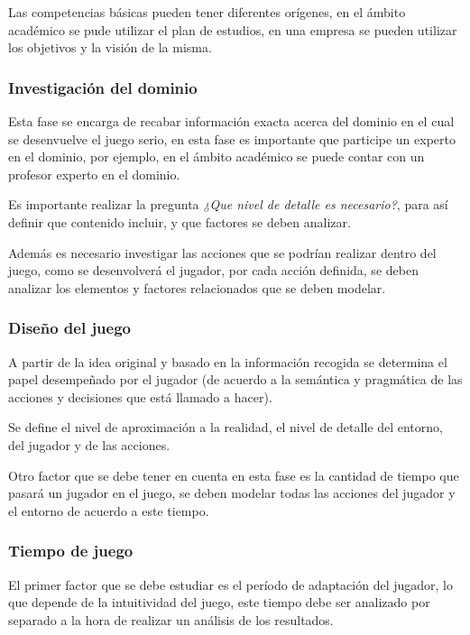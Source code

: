 Las competencias básicas pueden tener diferentes orígenes, en el ámbito académico se pude utilizar el plan de estudios, en una empresa se pueden utilizar los objetivos y la visión de la misma.

\subsubsection{Investigación del dominio}

Esta fase se encarga de recabar información exacta acerca del dominio en el cual se desenvuelve el juego serio, en esta fase es importante que participe un experto en el dominio, por ejemplo, en el ámbito académico se puede contar con un profesor experto en el dominio.

Es importante realizar la pregunta \emph{¿Que nivel de detalle es necesario?}, para así definir que contenido incluir, y que factores se deben analizar.

Además es necesario investigar las acciones que se podrían realizar dentro del juego, como se desenvolverá el jugador, por cada acción definida, se deben analizar los elementos y factores relacionados que se deben modelar.

\subsubsection{Diseño del juego}

A partir de la idea original y basado en la información recogida se determina el papel desempeñado por el jugador (de acuerdo a la semántica y pragmática de las acciones y decisiones que está llamado a hacer). 

Se define el nivel de aproximación a la realidad, el nivel de detalle del entorno, del jugador y de las acciones.

Otro factor que se debe tener en cuenta en esta fase es la cantidad de tiempo que pasará un jugador en el juego, se deben modelar todas las acciones del jugador y el entorno de acuerdo a este tiempo.

\subsubsection{Tiempo de juego}

El primer factor que se debe estudiar es el período de adaptación del jugador, lo que depende de la intuitividad del juego, este tiempo debe ser analizado por separado a la hora de realizar un análisis de los resultados.

